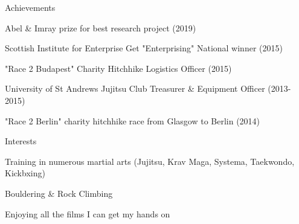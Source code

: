 
\begin{cventries}

  \cventry
    {} %
    {Achievements} %
    {} %
    {} %
    {
        \begin{cvitems}
        \item Abel \& Imray prize for best research project (2019)
        \item Scottish Institute for Enterprise Get "Enterprising" National winner (2015)
        \item "Race 2 Budapest" Charity Hitchhike Logistics Officer (2015)
        \item University of St Andrews Jujitsu Club Treasurer \& Equipment Officer (2013-2015)
        \item "Race 2 Berlin" charity hitchhike race from Glasgow to Berlin (2014)
        \end{cvitems}
    }

  \cventry
    {} %
    {Interests} %
    {} %
    {} %
    {
        \begin{cvitems}
        \item Training in numerous martial arts (Jujitsu, Krav Maga, Systema, Taekwondo, Kickbxing)
        \item Bouldering \& Rock Climbing
        \item Enjoying all the films I can get my hands on
        \end{cvitems}
    }



\end{cventries}

